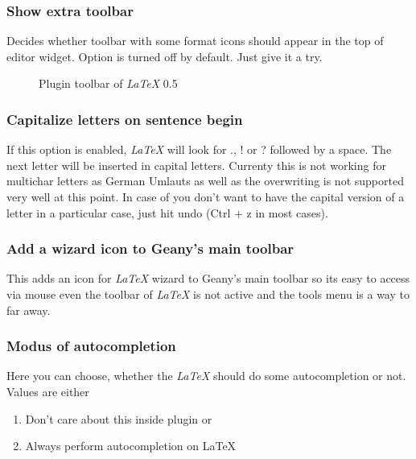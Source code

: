 \documentclass[%
paper=a4,%
fontsize=11pt,%
twoside=false,%
DIV18,%
headsepline,%
plainheadsepline,%
footsepline,%
plainfootsepline,%
bibliography=totoc,%
listof=totoc,%
BCOR10mm,%
parskip=half,%
openany,%
]{scrartcl}
\begin{document}
\subsubsection{Show extra toolbar}
Decides whether toolbar with some format icons should appear in the top
of editor widget. Option is turned off by default. Just give it a try.

\begin{figure}[h!]
	\caption{Plugin toolbar of \textit{LaTeX} 0.5}
\end{figure}


\subsubsection{Capitalize letters on sentence begin}

If this option is enabled, \textit{LaTeX} will look for \textsc{.},
\textsc{!} or \textsc{?} followed by a space. The next letter will
be inserted in capital letters. Currenty this is not working for
multichar letters as German Umlauts as well as the overwriting is
not supported very well at this point. In case of you don't want to
have the capital version of a letter in a particular case, just hit
undo (Ctrl + z in most cases).

\subsubsection{Add a wizard icon to Geany's main toolbar}
This adds an icon for \textit{LaTeX} wizard to Geany's main toolbar
so its easy to access via mouse even the toolbar of \textit{LaTeX} is
not active and the tools menu is a way to far away.

\subsubsection{Modus of autocompletion}
\label{sec:modus_of_autocompletion}
Here you can choose, whether the \textit{LaTeX} should do some
autocompletion or not. Values are either
\begin{enumerate}
	\item Don't care about this inside plugin or
	\item Always perform autocompletion on LaTeX
\end{enumerate}
\end{document}
